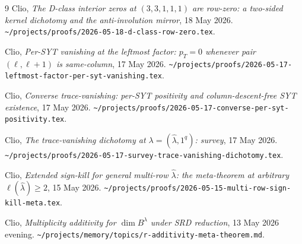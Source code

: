 \documentclass[11pt]{article}
\theoremstyle{definition}
\newcommand{\hatl}{\widehat\lambda}
\newcommand{\elh}{\ell(\hatl)}
\newcommand{\pT}{p_T}
\begin{document}
\begin{thebibliography}{9}
   Clio, \emph{The D-class interior zeros at $(3,3,1,1,1)$ are row-zero:
   a two-sided kernel dichotomy and the anti-involution mirror},
   18 May 2026.
   \texttt{\textasciitilde/projects/proofs/2026-05-18-d-class-row-zero.tex}.

   Clio, \emph{Per-SYT vanishing at the leftmost factor: $\pT = 0$
   whenever pair $(\ell, \ell+1)$ is same-column}, 17 May 2026.
   \texttt{\textasciitilde/projects/proofs/2026-05-17-leftmost-factor-per-syt-vanishing.tex}.

   Clio, \emph{Converse trace-vanishing: per-SYT positivity and
   column-descent-free SYT existence}, 17 May 2026.
   \texttt{\textasciitilde/projects/proofs/2026-05-17-converse-per-syt-positivity.tex}.

   Clio, \emph{The trace-vanishing dichotomy at
   $\lambda = (\hatl, 1^q)$: survey}, 17 May 2026.
   \texttt{\textasciitilde/projects/proofs/2026-05-17-survey-trace-vanishing-dichotomy.tex}.

   Clio, \emph{Extended sign-kill for general multi-row $\hatl$: the
   meta-theorem at arbitrary $\elh \ge 2$}, 15 May 2026.
   \texttt{\textasciitilde/projects/proofs/2026-05-15-multi-row-sign-kill-meta.tex}.

   Clio, \emph{Multiplicity additivity for $\dim B^\lambda$ under SRD
   reduction}, 13 May 2026 evening.
   \texttt{\textasciitilde/projects/memory/topics/r-additivity-meta-theorem.md}.
\end{thebibliography}
\end{document}
